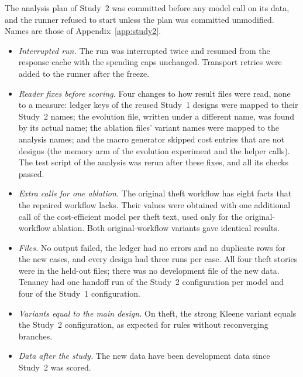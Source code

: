 The analysis plan of Study~2 was committed before any model call on its data, and the runner refused to start unless the plan was committed unmodified. Names are those of Appendix~\ref{app:study2}.
\begin{itemize}[leftmargin=1.2em,itemsep=1pt]
\item \emph{Interrupted run.} The run was interrupted twice and resumed from the response cache with the spending caps unchanged. Transport retries were added to the runner after the freeze.
\item \emph{Reader fixes before scoring.} Four changes to how result files were read, none to a measure: ledger keys of the reused Study~1 designs were mapped to their Study~2 names; the evolution file, written under a different name, was found by its actual name; the ablation files' variant names were mapped to the analysis names; and the macro generator skipped cost entries that are not designs (the memory arm of the evolution experiment and the helper calls). The test script of the analysis was rerun after these fixes, and all its checks passed.
\item \emph{Extra calls for one ablation.} The original theft workflow has eight facts that the repaired workflow lacks. Their values were obtained with one additional call of the cost-efficient model per theft text, used only for the original-workflow ablation. Both original-workflow variants gave identical results.
\item \emph{Files.} No output failed, the ledger had no errors and no duplicate rows for the new cases, and every design had three runs per case. All four theft stories were in the held-out files; there was no development file of the new data. Tenancy had one handoff run of the Study~2 configuration per model and four of the Study~1 configuration.
\item \emph{Variants equal to the main design.} On theft, the strong Kleene variant equals the Study~2 configuration, as expected for rules without reconverging branches.
\item \emph{Data after the study.} The new data have been development data since Study~2 was scored.
\end{itemize}
